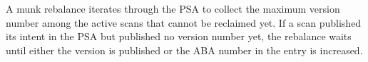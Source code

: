 \documentclass[letterpaper,twocolumn,10pt]{article}
\newcommand{\code}[1]{\textsf{\fontsize{9}{11}\selectfont #1}}
\begin{document}
A munk rebalance iterates through the \code{PSA} to collect the maximum version number among the active scans that cannot be reclaimed yet. If a scan published its intent in the \code{PSA} but published no version number yet, the rebalance waits until either the version is published or the ABA number in the entry is increased. 
\end{document}
